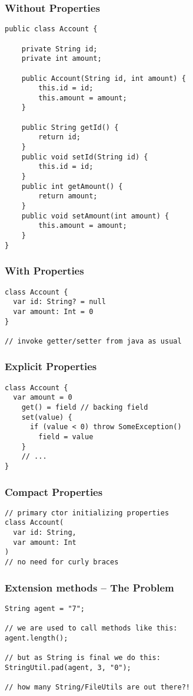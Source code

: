 \begin{frame}[fragile] \frametitle{Without Properties}
\begin{lstlisting}[basicstyle=\color{IJ_text}\ttfamily\tiny]
public class Account {
    
    private String id;
    private int amount;

    public Account(String id, int amount) {
        this.id = id;
        this.amount = amount;
    }

    public String getId() {
        return id;
    }
    public void setId(String id) {
        this.id = id;
    }
    public int getAmount() {
        return amount;
    }
    public void setAmount(int amount) {
        this.amount = amount;
    }
}
\end{lstlisting}
\end{frame}

\begin{frame}[fragile] \frametitle{With Properties}
\begin{lstlisting}
class Account {
  var id: String? = null
  var amount: Int = 0
}

// invoke getter/setter from java as usual
\end{lstlisting}
\end{frame}

\begin{frame}[fragile] \frametitle{Explicit Properties}
\begin{lstlisting}
class Account {
  var amount = 0
    get() = field // backing field
    set(value) {
      if (value < 0) throw SomeException()
        field = value
    }
    // ...
}
\end{lstlisting}
\end{frame}

\begin{frame}[fragile] \frametitle{Compact Properties}
\begin{lstlisting}
// primary ctor initializing properties
class Account(
  var id: String,
  var amount: Int
)
// no need for curly braces
\end{lstlisting}
\end{frame}


\begin{frame}[fragile] \frametitle{Extension methods -- The Problem}
\begin{lstlisting}
String agent = "7";

// we are used to call methods like this:
agent.length();

// but as String is final we do this:
StringUtil.pad(agent, 3, "0");

// how many String/FileUtils are out there?!
\end{lstlisting}
\end{frame}


